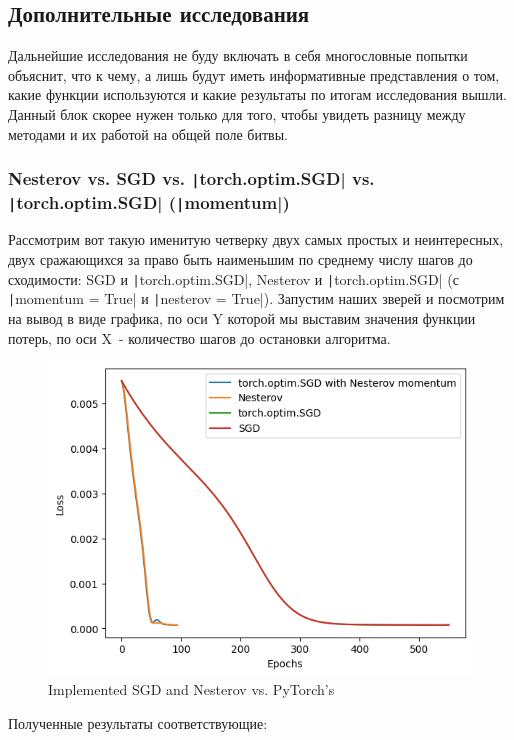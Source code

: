 \documentclass[12pt, a4paper, oneside, final]{article}
\begin{document}
	\subsection*{Дополнительные исследования}
	Дальнейшие исследования не буду включать в себя многословные попытки объяснит, что к чему, а лишь будут иметь информативные представления о том, какие функции используются и какие результаты по итогам исследования вышли.
	Данный блок скорее нужен только для того, чтобы увидеть разницу между методами и их работой на общей поле битвы.
	\subsubsection*{Nesterov vs. SGD vs. \texttt|torch.optim.SGD| vs. \texttt|torch.optim.SGD| (\texttt|momentum|)}
	Рассмотрим вот такую именитую четверку двух самых простых и неинтересных, двух сражающихся за право быть наименьшим по среднему числу шагов до сходимости: SGD и \texttt|torch.optim.SGD|, Nesterov и \texttt|torch.optim.SGD| (с \texttt|momentum = True| и \texttt|nesterov = True|).
	Запустим наших зверей и посмотрим на вывод в виде графика, по оси Y которой мы выставим значения функции потерь, по оси X~- количество шагов до остановки алгоритма.
	\begin{figure}[H]
		\centering
		\includegraphics[scale = 1]{Image/T1_SGD_vs_PYTORCH-SGD_vs_NESTEROV_vs_PYTORCH-NESTEROV.png}
		\caption*{Implemented SGD and Nesterov vs. PyTorch's}
	\end{figure}
	Полученные результаты соответствующие:
\end{document}
